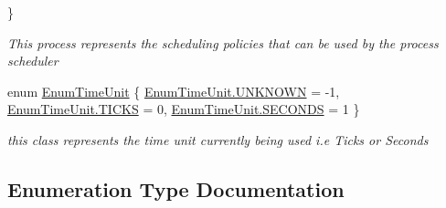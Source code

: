 \begin{DoxyCompactItemize}
 \}\begin{DoxyCompactList}\small\item\em This process represents the scheduling policies that can be used by the process scheduler \end{DoxyCompactList}
\item 
enum \hyperlink{namespace_c_p_u___o_s___simulator_1_1_operating___system_a0553d0bc2513aec52caa769acf994d5c}{Enum\+Time\+Unit} \{ \hyperlink{namespace_c_p_u___o_s___simulator_1_1_operating___system_a0553d0bc2513aec52caa769acf994d5ca696b031073e74bf2cb98e5ef201d4aa3}{Enum\+Time\+Unit.\+U\+N\+K\+N\+O\+W\+N} = -\/1, 
\hyperlink{namespace_c_p_u___o_s___simulator_1_1_operating___system_a0553d0bc2513aec52caa769acf994d5caecf45696420c3fbb68822dafc3378261}{Enum\+Time\+Unit.\+T\+I\+C\+K\+S} = 0, 
\hyperlink{namespace_c_p_u___o_s___simulator_1_1_operating___system_a0553d0bc2513aec52caa769acf994d5caa9126caa6ef3db9cf3c35ac627ad22b5}{Enum\+Time\+Unit.\+S\+E\+C\+O\+N\+D\+S} = 1
 \}\begin{DoxyCompactList}\small\item\em this class represents the time unit currently being used i.\+e Ticks or Seconds \end{DoxyCompactList}
\end{DoxyCompactItemize}


\subsection{Enumeration Type Documentation}
\hypertarget{namespace_c_p_u___o_s___simulator_1_1_operating___system_aea0b669d1bbf5690ae34ac2f8bef9470}{}
